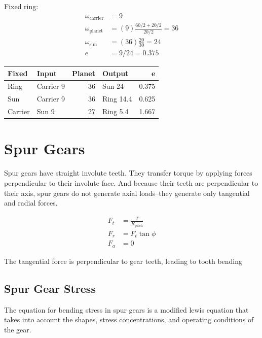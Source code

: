 \documentclass[a4paper,openany]{tufte-book}
\begin{document}
Fixed ring:\\

\begin{align*}
  \omega_{\text{carrier}} &= 9 \\
  \omega_{\text{planet}} &= (9) \frac{60/2 + 20/2}{20/2} = 36 \\
  \omega_{\text{sun}} &= (36) \frac{20}{30} = 24 \\
  e &= 9/24 = 0.375
\end{align*}

\begin{center}
\begin{tabular}{llrlr}
\toprule
Fixed & Input & Planet & Output & e\\
\midrule
Ring & Carrier 9 & 36 & Sun 24 & 0.375\\
Sun & Carrier 9 & 36 & Ring 14.4 & 0.625\\
Carrier & Sun 9 & 27 & Ring 5.4 & 1.667\\
\bottomrule
\end{tabular}
\end{center}

\chapter{Spur Gears}
\label{sec:org035e57c}

Spur gears have straight involute teeth. They transfer torque by applying forces perpendicular to their involute face. And because their teeth are perpendicular to their axis, spur gears do not generate axial loads--they generate only tangential and radial forces.

\begin{align}
\label{eq: spur gear forces}
  F_{t} &= \frac{T}{R_{\text{pitch}}} \\
  F_{r} &= F_{t} \tan \phi \\
  F_{a} &= 0
\end{align}

The tangential force is perpendicular to gear teeth, leading to tooth bending

\section{Spur Gear Stress}
\label{sec:orgdebc16c}

The equation for bending stress in spur gears is a modified lewis equation that takes into account the shapes, stress concentrations, and operating conditions of the gear.
\end{document}
